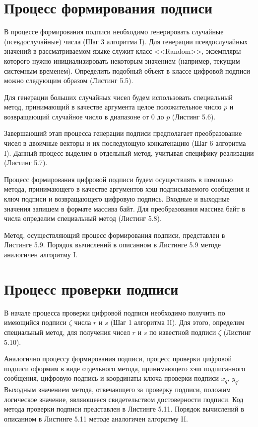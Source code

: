 \section{Процесс формирования подписи}
В процессе формирования подписи необходимо генерировать случайные (псевдослучайные) числа (Шаг 3 алгоритма I). Для генерации псевдослучайных значений в рассматриваемом языке служит класс <<Random>>, экземпляры которого нужно инициализировать некоторым значением (например, текущим системным временем). Определить подобный объект в классе цифровой подписи можно следующим образом (Листинг 5.5).

\par
Для генерации больших случайных чисел будем использовать специальный метод, принимающий в качестве аргумента целое положительное число $p$ и возвращающий случайное число в диапазоне от $0$ до $p$ (Листинг 5.6).
\newpage

\par
Завершающий этап процесса генерации подписи предполагает преобразование чисел в двоичные векторы и их последующую конкатенацию (Шаг 6 алгоритма I). Данный процесс выделим в отдельный метод, учитывая специфику реализации (Листинг 5.7).

\par
Процесс формирования цифровой подписи будем осуществлять в помощью метода, принимающего в качестве аргументов хэш подписываемого сообщения и ключ подписи и возвращающего цифровую подпись. Входные и выходные значения запишем в формате массива байт. Для преобразования массива байт в числа определим специальный метод (Листинг 5.8).

\par
Метод, осуществляющий процесс формирования подписи, представлен в Листинге 5.9. Порядок вычислений в описанном в Листинге 5.9 методе аналогичен алгоритму I.

\par
\section{Процесс проверки подписи}
В начале процесса проверки цифровой подписи необходимо получить по имеющийся подписи $\zeta$ числа $r$ и $s$ (Шаг 1 алгоритма II). Для этого, определим специальный метод, для получения чисел $r$ и $s$ по известной подписи $\zeta$ (Листинг 5.10).

\par
Аналогично процессу формирования подписи, процесс проверки цифровой подписи оформим в виде отдельного метода, принимающего хэш подписанного сообщения, цифровую подпись и координаты ключа проверки подписи $x_q$, $y_q$. Выходным значением метода, отвечающего за проверку подписи, положим логическое значение, являющееся свидетельством достоверности подписи. Код метода проверки подписи представлен в Листинге 5.11. Порядок вычислений в описанном в Листинге 5.11 методе аналогичен алгоритму II.


